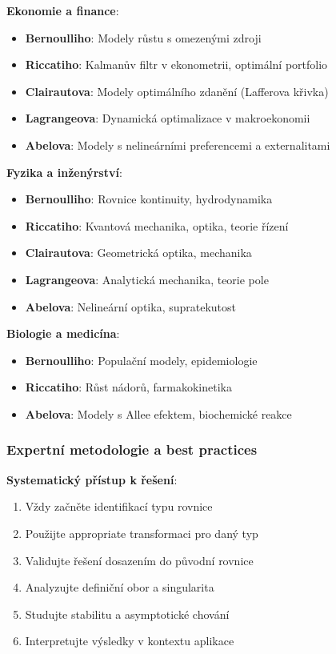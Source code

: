 \noindent\textbf{Ekonomie a finance}:
\begin{itemize}
\item \textbf{Bernoulliho}: Modely růstu s omezenými zdroji
\item \textbf{Riccatiho}: Kalmanův filtr v ekonometrii, optimální portfolio
\item \textbf{Clairautova}: Modely optimálního zdanění (Lafferova křivka)
\item \textbf{Lagrangeova}: Dynamická optimalizace v makroekonomii
\item \textbf{Abelova}: Modely s nelineárními preferencemi a externalitami
\end{itemize}

\vspace{1\baselineskip}

\noindent\textbf{Fyzika a inženýrství}:
\begin{itemize}
\item \textbf{Bernoulliho}: Rovnice kontinuity, hydrodynamika
\item \textbf{Riccatiho}: Kvantová mechanika, optika, teorie řízení
\item \textbf{Clairautova}: Geometrická optika, mechanika
\item \textbf{Lagrangeova}: Analytická mechanika, teorie pole
\item \textbf{Abelova}: Nelineární optika, supratekutost
\end{itemize}

\vspace{1\baselineskip}

\noindent\textbf{Biologie a medicína}:
\begin{itemize}
\item \textbf{Bernoulliho}: Populační modely, epidemiologie
\item \textbf{Riccatiho}: Růst nádorů, farmakokinetika
\item \textbf{Abelova}: Modely s Allee efektem, biochemické reakce
\end{itemize}

\subsubsection{Expertní metodologie a best practices}
\label{subsec:metodologie-uroven2}

\noindent\textbf{Systematický přístup k řešení}:
\begin{enumerate}
\item Vždy začněte identifikací typu rovnice
\item Použijte appropriate transformaci pro daný typ
\item Validujte řešení dosazením do původní rovnice
\item Analyzujte definiční obor a singularita
\item Studujte stabilitu a asymptotické chování
\item Interpretujte výsledky v kontextu aplikace
\end{enumerate}

